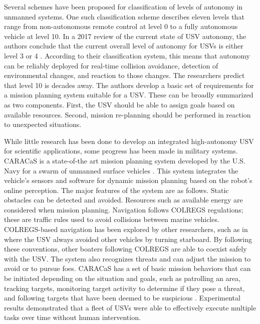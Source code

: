 \documentclass{tamuccthesis}
\begin{document}
Several schemes have been proposed for classification of levels of autonomy in unmanned systems. One such classification scheme describes eleven levels that range from non-autonomous remote control at level 0 to a fully autonomous vehicle at level 10. In a 2017 review of the current state of USV autonomy, the authors conclude that the current overall level of autonomy for USVs is either level 3 or 4 \cite{heo2017case}. According to their classification system, this means that autonomy can be reliably deployed for real-time collision avoidance, detection of environmental changes, and reaction to those changes. The researchers predict that level 10 is decades away. The authors develop a basic set of requirements for a mission planning system suitable for a USV. These can be broadly summarized as two components. First, the USV should be able to assign goals based on available resources. Second, mission re-planning should be performed in reaction to unexpected situations. 

While little research has been done to develop an integrated high-autonomy USV for scientific applications, some progress has been made in military systems. CARACaS is a state-of-the art mission planning system developed by the U.S. Navy for a swarm of unmanned surface vehicles \cite{heo2017case}. This system integrates the vehicle's sensors and software for dynamic mission planning based on the robot's online perception. The major features of the system are as follows. Static obstacles can be detected and avoided. Resources such as available energy are considered when mission planning. Navigation follows COLREGS regulations; these are traffic rules used to avoid collisions between marine vehicles. COLREGS-based navigation has been explored by other researchers, such as in \cite{naeem2012colregs} where the USV always avoided other vehicles by turning starboard. By following these conventions, other boaters following COLREGS are able to coexist safely with the USV. The system also recognizes threats and can adjust the mission to avoid or to pursue foes. CARACaS has a set of basic mission behaviors that can be initiated depending on the situation and goals, such as patrolling an area, tracking targets, monitoring target activity to determine if they pose a threat, and following targets that have been deemed to be suspicious \cite{wolf2017caracas}. Experimental results demonstrated that a fleet of USVs were able to effectively execute multiple tasks over time without human intervention. 
\end{document}
